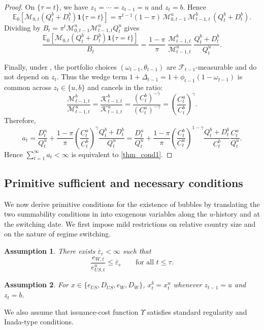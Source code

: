 \documentclass[12pt]{article}
\theoremstyle{plain}
\newtheorem{ass}{Assumption}
\begin{document}
\begin{proof}
On $\{\tau=t\}$, we have $z_1=\cdots=z_{t-1}=u$ and $z_t=b$. Hence
\[
\mathbb E_0\!\left[\mathcal M_{0,t}(Q_t^b+D_t^b)\mathbf 1\{\tau=t\}\right]
=\pi^{t-1}(1-\pi)\,\mathcal M_{0,t-1}^u\,\mathcal M_{t-1,t}^b\,(Q_t^b+D_t^b).
\]
Dividing by $B_t=\pi^{t}\mathcal M_{0,t-1}^u\mathcal M_{t-1,t}^u Q_t^u$ gives
\[
\frac{\mathbb E_0[\mathcal M_{0,t}(Q_t^b+D_t^b)\mathbf 1\{\tau=t\}]}{B_t}
=
\frac{1-\pi}{\pi}\;
\frac{\mathcal M_{t-1,t}^b}{\mathcal M_{t-1,t}^u}\;
\frac{Q_t^b+D_t^b}{Q_t^u}.
\]

Finally, under , the portfolio choices $(\omega_{t-1},\theta_{t-1})$ are $\mathcal F_{t-1}$-measurable and do not depend on $z_t$.
Thus the wedge term $1+\Delta_{t-1}=1+\phi_{t-1}(1-\omega_{t-1})$ is common across $z_t\in\{u,b\}$ and cancels in the ratio:
\[
\frac{\mathcal M_{t-1,t}^b}{\mathcal M_{t-1,t}^u}
=
\frac{\mathcal K_{t-1,t}^b}{\mathcal K_{t-1,t}^u}
=
\frac{(C_t^b)^{-\gamma}}{(C_t^u)^{-\gamma}}
=
\left(\frac{C_t^u}{C_t^b}\right)^{\gamma}.
\]
Therefore,
\[
a_t
=
\frac{D_t^u}{Q_t^u}
+\frac{1-\pi}{\pi}\left(\frac{C_t^u}{C_t^b}\right)^{\gamma}\frac{Q_t^b+D_t^b}{Q_t^u}
=
\frac{D_t^u}{Q_t^u}
+\frac{1-\pi}{\pi}
\left(\frac{C_t^b}{C_t^u}\right)^{1-\gamma}
\frac{Q_t^b+D_t^b}{C_t^b}\frac{C_t^u}{Q_t^u}.
\]
Hence $\sum_{t=1}^\infty a_t<\infty$ is equivalent to \eqref{thm_cond1}.
\end{proof}

\subsection{Primitive sufficient and necessary conditions}

We now derive primitive conditions for the existence of bubbles by translating the two summability conditions
in  into exogenous variables along the $u$-history and at the switching date. We first impose mild
restrictions on relative country size and on the nature of regime switching.

\begin{ass}\label{ass4}
There exists $\overline\varepsilon_e<\infty$ such that
\[
\frac{e_{W,t}}{e_{US,t}^u}\le \overline\varepsilon_e
\qquad\text{for all }t\le \tau .
\]
\end{ass}

\begin{ass}\label{ass5}
For $x\in\{e_{US},D_{US},e_W,D_W\}$, $x_t^b=x_t^u$ whenever $z_{t-1}=u$ and $z_t=b$.
\end{ass}


We also assume that issuance-cost function $\Upsilon$
 satisfies standard regularity and Inada-type conditions.
\end{document}
